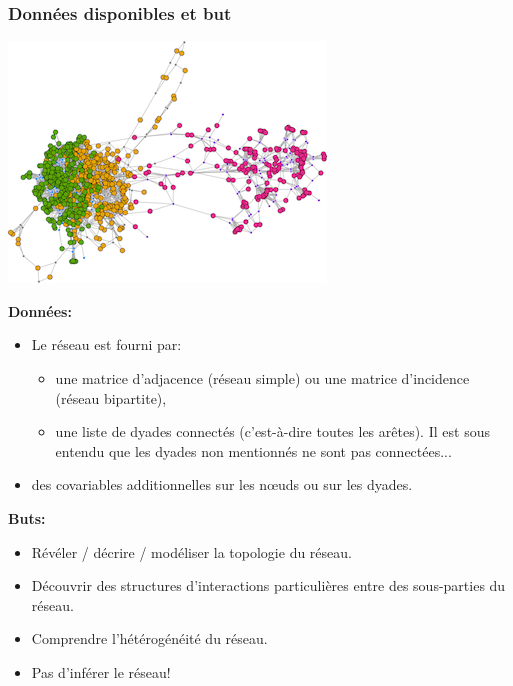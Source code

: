 \documentclass[nopagenumber,9pt]{beamer}
\begin{document}
\begin{frame}
 \frametitle{Données disponibles et but}
 
 
\begin{center}
 \includegraphics[scale=.4]{plots/image_SBM.png}
\end{center}

\bigskip
\textbf{Données:}
\begin{itemize}
 \item  Le réseau est fourni par:
\begin{itemize}
 \item une matrice d'adjacence (réseau simple) ou une matrice d'incidence (réseau bipartite),
 \item une liste de dyades connectés (c'est-à-dire toutes les ar\^etes). Il est sous entendu que les dyades non mentionnés ne sont pas connectées...
\end{itemize}

\item des covariables additionnelles sur les n\oe uds ou sur les dyades.
 \end{itemize}



\bigskip


\textbf{Buts:}
\begin{itemize}
 \item Révéler / décrire / modéliser la topologie du réseau. 
 \item Découvrir des structures d'interactions particulières entre des sous-parties du réseau.
 \item Comprendre l'hétérogénéité du réseau.
 \item Pas d'inférer le réseau!
 \end{itemize}


\end{frame}
\end{document}
